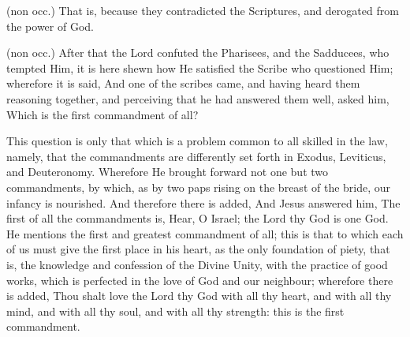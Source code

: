  (non occ.) That is, because they contradicted the Scriptures, and derogated from the power of God.

 

 (non occ.) After that the Lord confuted the Pharisees, and the Sadducees, who tempted Him, it is here shewn how He satisfied the Scribe who questioned Him; wherefore it is said, And one of the scribes came, and having heard them reasoning together, and perceiving that he had answered them well, asked him, Which is the first commandment of all?

 This question is only that which is a problem common to all skilled in the law, namely, that the commandments are differently set forth in Exodus, Leviticus, and Deuteronomy. Wherefore He brought forward not one but two commandments, by which, as by two paps rising on the breast of the bride, our infancy is nourished. And therefore there is added, And Jesus answered him, The first of all the commandments is, Hear, O Israel; the Lord thy God is one God. He mentions the first and greatest commandment of all; this is that to which each of us must give the first place in his heart, as the only foundation of piety, that is, the knowledge and confession of the Divine Unity, with the practice of good works, which is perfected in the love of God and our neighbour; wherefore there is added, Thou shalt love the Lord thy God with all thy heart, and with all thy mind, and with all thy soul, and with all thy strength: this is the first commandment.

